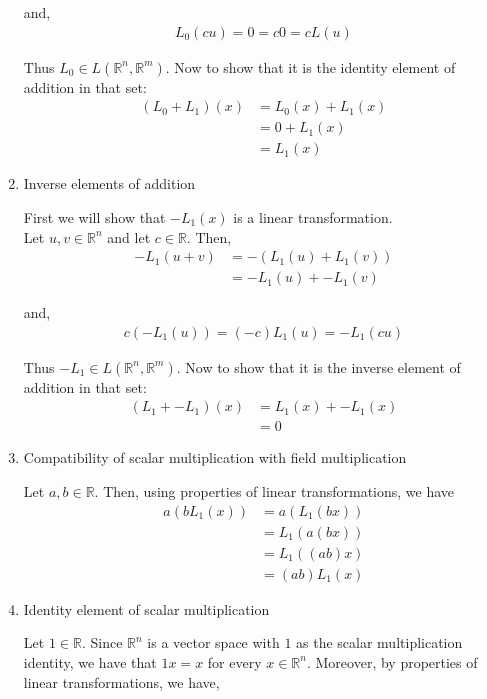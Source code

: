 \documentclass[12pt]{article}
\begin{document}
\begin{enumerate}
and,
\begin{align*}
L_0(cu) = 0 = c0 = cL(u)
\end{align*}

Thus $L_0 \in L(\mathbb{R}^n, \mathbb{R}^m)$. Now to show that it is the identity element of addition in that set:
\begin{align*}
(L_0 + L_1)(x) &= L_0(x) + L_1(x)\\
&= 0 + L_1(x)\\
&= L_1(x)
\end{align*}

\item Inverse elements of addition

First we will show that $-L_1(x)$ is a linear transformation.\\

Let $u, v \in \mathbb{R}^n$ and let $c \in \mathbb{R}$. Then,
\begin{align*}
-L_1(u + v) &= -(L_1(u) + L_1(v))\\
&= -L_1(u) + -L_1(v)
\end{align*}

and,
\begin{align*}
c(-L_1(u)) = (-c)L_1(u) = -L_1(cu)
\end{align*}

Thus $-L_1 \in L(\mathbb{R}^n, \mathbb{R}^m)$. Now to show that it is the inverse element of addition in that set:
\begin{align*}
(L_1 + -L_1)(x) &= L_1(x) + -L_1(x)\\
&= 0
\end{align*}

\item Compatibility of scalar multiplication with field multiplication

Let $a, b \in \mathbb{R}$. Then, using properties of linear transformations, we have
\begin{align*}
a(bL_1(x)) &= a(L_1(bx))\\
&= L_1(a(bx))\\
&= L_1((ab)x)\\
&= (ab)L_1(x)
\end{align*}

\item Identity element of scalar multiplication	

Let $1 \in \mathbb{R}$. Since $\mathbb{R}^n$ is a vector space with $1$ as the scalar multiplication identity, we have that $1x = x$ for every $x \in \mathbb{R}^n$. Moreover, by properties of linear transformations, we have,


\end{enumerate}
\end{document}

